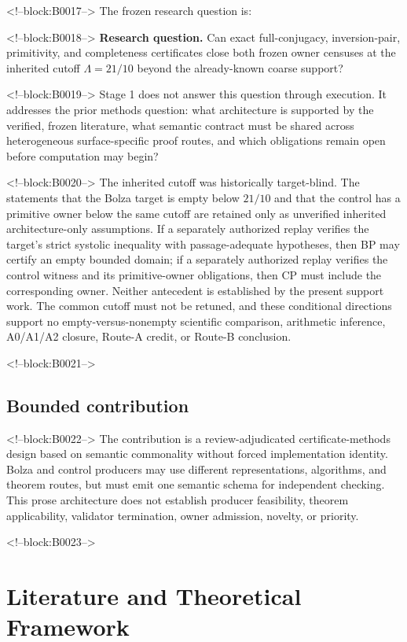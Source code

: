 \documentclass[11pt,a4paper]{article}
\begin{document}
<!--block:B0017-->
The frozen research question is:

<!--block:B0018-->
\textbf{Research question.} Can exact full-conjugacy, inversion-pair, primitivity, and completeness certificates close both frozen owner censuses at the inherited cutoff \(\Lambda=21/10\) beyond the already-known coarse support?

<!--block:B0019-->
Stage 1 does not answer this question through execution. It addresses the prior methods question: what architecture is supported by the verified, frozen literature, what semantic contract must be shared across heterogeneous surface-specific proof routes, and which obligations remain open before computation may begin?

<!--block:B0020-->
The inherited cutoff was historically target-blind. The statements that the Bolza target is empty below \(21/10\) and that the control has a primitive owner below the same cutoff are retained only as unverified inherited architecture-only assumptions. If a separately authorized replay verifies the target's strict systolic inequality with passage-adequate hypotheses, then BP may certify an empty bounded domain; if a separately authorized replay verifies the control witness and its primitive-owner obligations, then CP must include the corresponding owner. Neither antecedent is established by the present support work. The common cutoff must not be retuned, and these conditional directions support no empty-versus-nonempty scientific comparison, arithmetic inference, A0/A1/A2 closure, Route-A credit, or Route-B conclusion.

<!--block:B0021-->
\hypertarget{bounded-contribution}{%
\subsection{Bounded contribution}\label{bounded-contribution}}

<!--block:B0022-->
The contribution is a review-adjudicated certificate-methods design based on semantic commonality without forced implementation identity. Bolza and control producers may use different representations, algorithms, and theorem routes, but must emit one semantic schema for independent checking. This prose architecture does not establish producer feasibility, theorem applicability, validator termination, owner admission, novelty, or priority.

<!--block:B0023-->
\hypertarget{literature-and-theoretical-framework}{%
\section{Literature and Theoretical Framework}\label{literature-and-theoretical-framework}}
\end{document}
